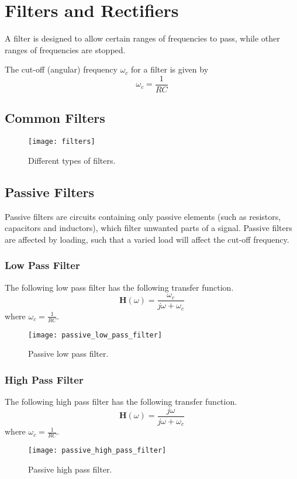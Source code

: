 \documentclass{article}
\begin{document}
\section{Filters and Rectifiers}
\begin{definition}[Filters]
    A filter is designed to allow certain ranges of frequencies to pass,
    while other ranges of frequencies are stopped.
\end{definition}
\begin{definition}
    The cut-off (angular) frequency $\omega_c$ for a filter is given by
    \begin{equation*}
        \omega_c = \frac{1}{RC}
    \end{equation*}
\end{definition}
\subsection{Common Filters}
\begin{figure}[H]
    \centering
    \texttt{[image: filters]}
    \caption{Different types of filters.}
\end{figure}
\subsection{Passive Filters}
Passive filters are circuits containing only passive elements
(such as resistors, capacitors and inductors),
which filter unwanted parts of a signal.
Passive filters are affected by loading, such that a varied load will
affect the cut-off frequency.
\subsubsection{Low Pass Filter}
The following low pass filter has the following transfer function.
\begin{equation*}
    \symbf{H}(\omega) = \frac{\omega_c}{j\omega + \omega_c}
\end{equation*}
where $\displaystyle \omega_c = \frac{1}{RC}$.
\begin{figure}[H]
    \centering
    \texttt{[image: passive\_low\_pass\_filter]}
    \caption{Passive low pass filter.}
\end{figure}
\subsubsection{High Pass Filter}
The following high pass filter has the following transfer function.
\begin{equation*}
    \symbf{H}(\omega) = \frac{j\omega}{j\omega + \omega_c}
\end{equation*}
where $\displaystyle \omega_c = \frac{1}{RC}$.
\begin{figure}[H]
    \centering
    \texttt{[image: passive\_high\_pass\_filter]}
    \caption{Passive high pass filter.}
\end{figure}
\end{document}
